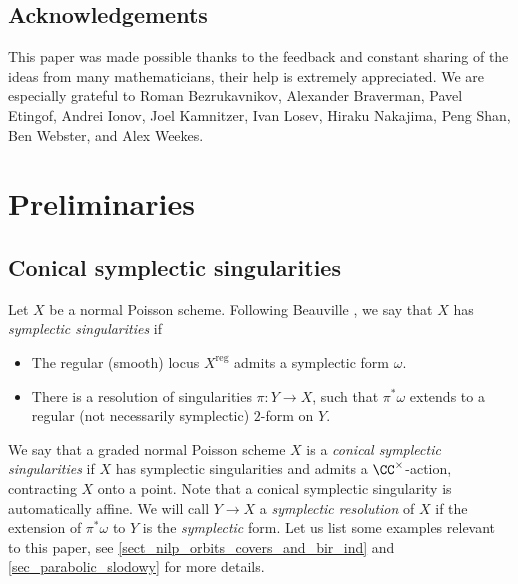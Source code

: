 \documentclass[12pt]{amsart}
\begin{document}
\subsection{Acknowledgements}
    This paper was made possible thanks to the feedback and constant sharing of the ideas from many mathematicians, their help is extremely appreciated. We are especially grateful to Roman Bezrukavnikov, Alexander Braverman, Pavel Etingof, Andrei Ionov, Joel Kamnitzer, Ivan Losev, Hiraku Nakajima, Peng Shan, Ben Webster, and Alex Weekes.


\tableofcontents
\section{Preliminaries}\label{sec_prelim}

 \subsection{Conical symplectic singularities}\label{conical sympl sing}
        Let $X$ be a normal Poisson scheme. Following Beauville \cite{Beauville2000}, we say that $X$ has \emph{symplectic singularities} if
        \begin{itemize}
            \item[(i)] The regular (smooth) locus $X^{\mathrm{reg}}$ admits a symplectic form $\omega$.
            \item[(ii)] There is a resolution of singularities $\pi\colon Y\to X$, such that $\pi^*\omega$ extends to a regular (not necessarily symplectic) $2$-form on $Y$.
        \end{itemize}

        We say that a graded normal Poisson scheme $X$ is a \emph{conical symplectic singularities} if $X$ has symplectic singularities and admits a $\CC^\times$-action, contracting $X$ onto a point. Note that a conical symplectic singularity is automatically affine. We will call $Y \rightarrow X$ a {\emph{symplectic resolution}} of $X$ if the extension of $\pi^*\omega$ to $Y$ is the {\emph{symplectic}} form. Let us list some examples relevant to this paper, see \cref{sect_nilp_orbits_covers_and_bir_ind} and \cref{sec_parabolic_slodowy} for more details.
\end{document}
